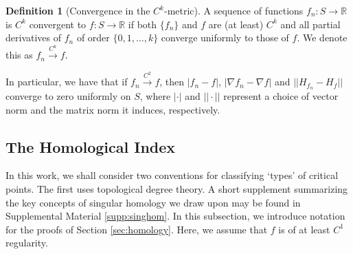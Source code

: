 \documentclass[11pt]{article}
\newcommand{\1}{\mathbf{1}}
\theoremstyle{definition}
\newtheorem{defn}{Definition}%
\theoremstyle{remark}
\begin{document}
\begin{mdframed}
    \begin{defn}[Convergence in the $C^k$-metric]
        A sequence of functions $f_n:S\rightarrow \mathbb{R}$ is $C^k$ convergent to $f$$:S \rightarrow \mathbb{R}$ if both $\{f_n\}$ and $f$ are (at least) $C^k$ and all partial derivatives of $f_n$ of order $\{ 0, 1, \dots, k\}$ converge uniformly to those of $f$. We denote this as $f_n\xrightarrow{C^k} f$.
    \end{defn}
    \vspace*{0.25cm}
\end{mdframed}
In particular, we have that if $f_n\xrightarrow{C^2} f$, then $|f_n-f|$, $|\nabla f_n-\nabla f|$ and $||H_{f_n}-H_f||$ converge to zero uniformly on $S$, where $|\cdot|$ and $||\cdot||$ represent a choice of vector norm and the matrix norm it induces, respectively. \\

\subsection{The Homological Index}\label{sec:homology_notation}

In this work, we shall consider two conventions for classifying `types' of critical points. The first uses topological degree theory. A short supplement summarizing the key concepts of singular homology we draw upon may be found in Supplemental Material \ref{supp:singhom}. In this subsection, we introduce notation for the proofs of Section \ref{sec:homology}. Here, we assume that $f$ is of at least $C^1$ regularity. 
\end{document}
